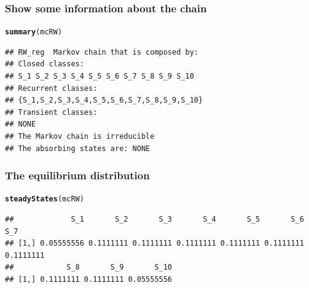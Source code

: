 \documentclass[aspectratio=169]{beamer}\usepackage[]{graphicx}\usepackage[]{xcolor}
\makeatletter
\newcommand{\hlnum}[1]{\textcolor[rgb]{0.686,0.059,0.569}{#1}}%
\newcommand{\hlsng}[1]{\textcolor[rgb]{0.192,0.494,0.8}{#1}}%
\newcommand{\hlcom}[1]{\textcolor[rgb]{0.678,0.584,0.686}{\textit{#1}}}%
\newcommand{\hlopt}[1]{\textcolor[rgb]{0,0,0}{#1}}%
\newcommand{\hldef}[1]{\textcolor[rgb]{0.345,0.345,0.345}{#1}}%
\newcommand{\hlkwb}[1]{\textcolor[rgb]{0.69,0.353,0.396}{#1}}%
\newcommand{\hlkwc}[1]{\textcolor[rgb]{0.333,0.667,0.333}{#1}}%
\newcommand{\hlkwd}[1]{\textcolor[rgb]{0.737,0.353,0.396}{\textbf{#1}}}%
\newenvironment{kframe}{%
 \def\at@end@of@kframe{}%
 \ifinner\ifhmode%
  \def\at@end@of@kframe{\end{minipage}}%
  \begin{minipage}{\columnwidth}%
 \fi\fi%
 \def\FrameCommand##1{\hskip\@totalleftmargin \hskip-\fboxsep
 \colorbox{shadecolor}{##1}\hskip-\fboxsep
     \hskip-\linewidth \hskip-\@totalleftmargin \hskip\columnwidth}%
 \MakeFramed {\advance\hsize-\width
   \@totalleftmargin\z@ \linewidth\hsize
   \@setminipage}}%
 {\par\unskip\endMakeFramed%
 \at@end@of@kframe}
\newenvironment{knitrout}{}{} %
\makeatother
\begin{document}

\begin{frame}[fragile]\frametitle{Show some information about the chain}
\begin{knitrout}
\color{fgcolor}\begin{kframe}
\begin{alltt}
\hlkwd{summary}\hldef{(mcRW)}
\end{alltt}
\begin{verbatim}
## RW_reg  Markov chain that is composed by: 
## Closed classes: 
## S_1 S_2 S_3 S_4 S_5 S_6 S_7 S_8 S_9 S_10 
## Recurrent classes: 
## {S_1,S_2,S_3,S_4,S_5,S_6,S_7,S_8,S_9,S_10}
## Transient classes: 
## NONE 
## The Markov chain is irreducible 
## The absorbing states are: NONE
\end{verbatim}
\end{kframe}
\end{knitrout}
\end{frame}

\begin{frame}[fragile]\frametitle{The equilibrium distribution}
\begin{knitrout}
\color{fgcolor}\begin{kframe}
\begin{alltt}
\hlkwd{steadyStates}\hldef{(mcRW)}
\end{alltt}
\begin{verbatim}
##             S_1       S_2       S_3       S_4       S_5       S_6       S_7
## [1,] 0.05555556 0.1111111 0.1111111 0.1111111 0.1111111 0.1111111 0.1111111
##            S_8       S_9       S_10
## [1,] 0.1111111 0.1111111 0.05555556
\end{verbatim}
\end{kframe}
\end{knitrout}
\end{frame}
\end{document}
